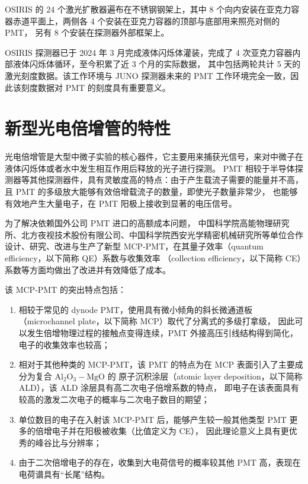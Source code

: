 OSIRIS 的 24 个激光扩散器遍布在不锈钢钢架上，其中 8 个向内安装在亚克力容器赤道平面上，两侧各 4 个安装在亚克力容器的顶部与底部用来照亮对侧的 PMT，
另有 8 个安装在探测器外部框架上。

OSIRIS 探测器已于 2024 年 3 月完成液体闪烁体灌装，完成了 4 次亚克力容器内部液体闪烁体循环，至今积累了近 3 个月的实际数据，
其中包括两轮共计 5 天的激光刻度数据。该工作环境与 JUNO 探测器未来的 PMT 工作环境完全一致，因此该刻度数据对 PMT 的刻度具有重要意义。

\section{新型光电倍增管的特性}
光电倍增管是大型中微子实验的核心器件，它主要用来捕获光信号，来对中微子在液体闪烁体或者水中发生相互作用后释放的光子进行探测。
PMT 相较于半导体探测器等其他探测器件，具有灵敏度高的特点：由于产生载流子需要的能量并不高，
且 PMT 的多级放大能够有效倍增载流子的数量，即使光子数量非常少，
也能够有效地产生大量电子，在 PMT 阳极上接收到显著的电压信号。

为了解决依赖国外公司 PMT 进口的高额成本问题，
中国科学院高能物理研究所、北方夜视技术股份有限公司、中国科学院西安光学精密机械研究所等单位合作
设计、研究、改进与生产了新型 MCP-PMT，在其量子效率（quantum efficiency，以下简称 QE）系数与收集效率
（collection efficiency，以下简称 CE）系数等方面均做出了改进并有效降低了成本。

该 MCP-PMT 的突出特点包括：
\begin{enumerate}
    \item 相较于常见的 dynode PMT，使用具有微小倾角的斜长微通道板（microchannel plate，以下简称 MCP）取代了分离式的多级打拿级，
    因此可以发生倍增物理过程的接触点变得连续，PMT 外接高压引线结构得到简化，电子的收集效率也较高；
    \item 相对于其他种类的 MCP-PMT，该 PMT 的特点为在 MCP 表面引入了主要成分为复合 $\text{Al}_2\text{O}_3-\text{MgO}$ 的
    原子沉积涂层（atomic layer deposition，以下简称 ALD），该 ALD 涂层具有高二次电子倍增系数的特点，
    即电子在该表面具有较高的激发二次电子的概率与二次电子数目的期望；
    \item 单位数目的电子在入射该 MCP-PMT 后，能够产生较一般其他类型 PMT 更多的倍增电子并在阳极被收集（比值定义为 CE），
    因此理论意义上具有更优秀的峰谷比与分辨率；
    \item 由于二次倍增电子的存在，收集到大电荷信号的概率较其他 PMT 高，表现在电荷谱具有“长尾”结构。
\end{enumerate}

